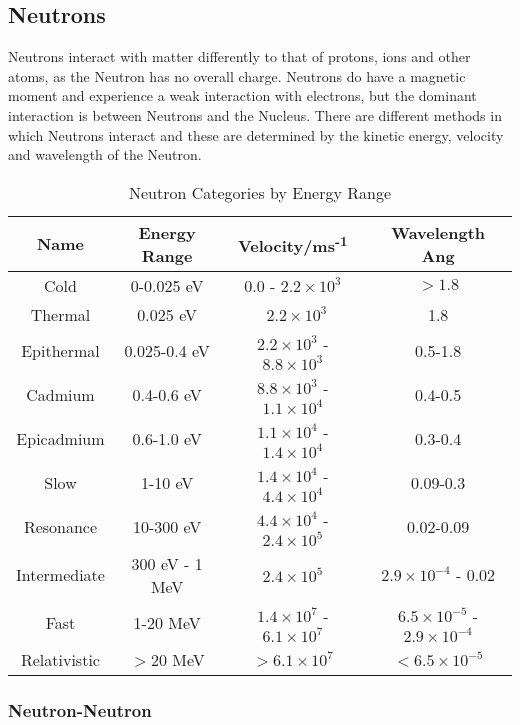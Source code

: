 \subsection{Neutrons}


Neutrons interact with matter differently to that of protons, ions and other atoms, as the Neutron has no overall charge.  Neutrons do have a magnetic moment and experience a weak interaction with electrons, but the dominant interaction is between Neutrons and the Nucleus.  There are different methods in which Neutrons interact and these are determined by the kinetic energy, velocity and wavelength of the Neutron.  

 
\begin{table}[h]
\begin{center}
\begin{tabular}{c c c c}
\hline
Name & Energy Range & Velocity/ms\textsuperscript{-1} & Wavelength Ang \\
\hline
Cold & 0-0.025 eV & 0.0 - $2.2 \times 10^{3}$ &  $> 1.8$  \\
Thermal & 0.025 eV & ~$2.2 \times 10^{3}$ &  1.8  \\
Epithermal & 0.025-0.4 eV & $2.2 \times 10^{3}$ - $8.8 \times 10^{3}$ &  0.5-1.8 \\
Cadmium & 0.4-0.6 eV & $8.8 \times 10^{3}$ - $1.1 \times 10^4$ & 0.4-0.5  \\
Epicadmium & 0.6-1.0 eV & $1.1 \times 10^4$ - $1.4 \times 10^4$ & 0.3-0.4\\
Slow & 1-10 eV & $1.4 \times 10^4$ - $4.4 \times 10^4$   & 0.09-0.3\\
Resonance & 10-300 eV & $4.4 \times 10^4$ - $2.4 \times 10^5$ & 0.02-0.09\\
Intermediate & 300 eV - 1 MeV &  $2.4 \times 10^5$ & $2.9 \times 10^{-4}$ - $0.02$\\
Fast & 1-20 MeV & $1.4 \times 10^7$ - $6.1 \times 10^7$ & $6.5 \times 10^{-5}$ - $2.9 \times 10^{-4}$ \\
Relativistic & $>20$ MeV & $>6.1 \times 10^{7}$ & $< 6.5 \times 10^{-5}$\\
\end{tabular}
\end{center}
\caption{Neutron Categories by Energy Range \cite{njcarron}}
\end{table}








\subsubsection{Neutron-Neutron}



